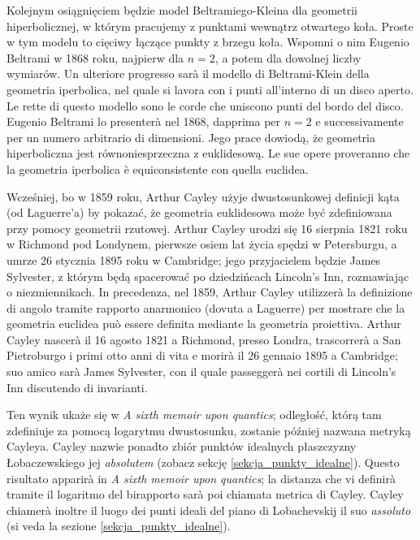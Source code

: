 Kolejnym osiągnięciem będzie model Beltramiego-Kleina dla geometrii hiperbolicznej, w którym pracujemy z punktami wewnątrz otwartego koła. %
Proste w tym modelu to cięciwy łączące punkty z brzegu koła. %
Wspomni o nim Eugenio Beltrami w 1868 roku, najpierw dla $n = 2$, a potem dla dowolnej liczby wymiarów. %
Un ulteriore progresso sarà il modello di Beltrami-Klein della geometria iperbolica, nel quale si lavora con i punti all'interno di un disco aperto. %
Le rette di questo modello sono le corde che uniscono punti del bordo del disco. %
Eugenio Beltrami lo presenterà nel 1868, dapprima per $n=2$ e successivamente per un numero arbitrario di dimensioni. %
Jego prace dowiodą, że geometria hiperboliczna jest równoniesprzeczna z euklidesową. %
Le sue opere proveranno che la geometria iperbolica è equiconsistente con quella euclidea. %

Wcześniej, bo w 1859 roku, Arthur Cayley użyje dwustosunkowej definicji kąta (od Laguerre'a) by pokazać, że geometria euklidesowa może być zdefiniowana przy pomocy geometrii rzutowej. %
Arthur Cayley urodzi się 16 sierpnia 1821 roku w Richmond pod Londynem, pierwsze osiem lat życia spędzi w Petersburgu, a umrze 26 stycznia 1895 roku w Cambridge; jego przyjacielem będzie James Sylvester, z którym będą spacerować po dziedzińcach Lincoln's Inn, rozmawiając o niezmiennikach. %
In precedenza, nel 1859, Arthur Cayley utilizzerà la definizione di angolo tramite rapporto anarmonico (dovuta a Laguerre) per mostrare che la geometria euclidea può essere definita mediante la geometria proiettiva. %
Arthur Cayley nascerà il 16 agosto 1821 a Richmond, presso Londra, trascorrerà a San Pietroburgo i primi otto anni di vita e morirà il 26 gennaio 1895 a Cambridge; suo amico sarà James Sylvester, con il quale passeggerà nei cortili di Lincoln's Inn discutendo di invarianti. %
%
%
%

Ten wynik ukaże się w \emph{A sixth memoir upon quantics}; odległość, którą tam zdefiniuje za pomocą logarytmu dwustosunku, zostanie później nazwana metryką Cayleya. %
Cayley nazwie ponadto zbiór punktów idealnych płaszczyzny Łobaczewskiego jej \emph{absolutem} \cite[s. 307]{eves1_1972} (zobacz sekcję \ref{sekcja_punkty_idealne}). %
Questo risultato apparirà in \emph{A sixth memoir upon quantics}; la distanza che vi definirà tramite il logaritmo del birapporto sarà poi chiamata metrica di Cayley. %
Cayley chiamerà inoltre il luogo dei punti ideali del piano di Lobachevskij il suo \emph{assoluto} \cite[p. 307]{eves1_1972} (si veda la sezione \ref{sekcja_punkty_idealne}). %

